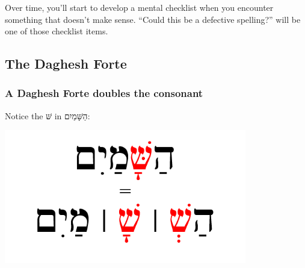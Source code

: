 \documentclass[
]{turabian-researchpaper}
\begin{document}
Over time, you'll start to develop a mental checklist when you encounter something that doesn't make sense. ``Could this be a defective spelling?'' will be one of those checklist items.

\hypertarget{two_5}{%
\subsection{The Daghesh Forte}\label{two_5}}

\hypertarget{a-daghesh-forte-doubles-the-consonant}{%
\subsubsection*{A Daghesh Forte doubles the consonant}\label{a-daghesh-forte-doubles-the-consonant}}

Notice the שּׁ in הַשָּׁמַיִם:

\begin{center}\includegraphics[width=300pt]{images/02.Hashamayim} \end{center}
\end{document}
